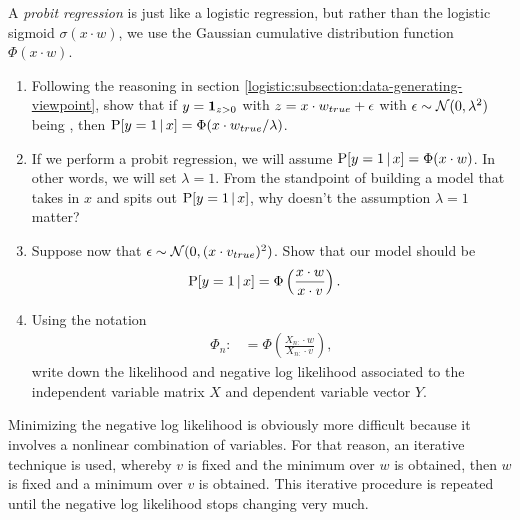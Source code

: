 \begin{exercise}
  A \emph{probit regression} is just like a logistic regression, but rather than the logistic sigmoid $\sigma(x\cdot w)$, we use the Gaussian cumulative distribution function $\Phi(x\cdot w)$. 
  \begin{enumerate}
    \item Following the reasoning in section \ref{logistic:subsection:data-generating-viewpoint}, show that if $y = \mathbf{1}_{z>0}$ with $z = x\cdot w_{true}+{\epsilon}$ with ${\epsilon}\sim{\mathcal N}(0, \lambda^2)$ being \iid, then  $\mathrm{P}[y=1{\,|\,} x] = \Phi(x\cdot w_{true}/\lambda)$.
    \item If we perform a probit regression, we will assume $\mathrm{P}[y=1{\,|\,} x] = \Phi(x\cdot w)$.  In other words, we will set $\lambda=1$.  From the standpoint of building a model that takes in $x$ and spits out $\mathrm{P}[y=1{\,|\,} x]$, why doesn't the assumption $\lambda=1$ matter?
    \item Suppose now that ${\epsilon} \sim{\mathcal N}(0, (x\cdot v_{true})^2)$.  Show that our model should be
      \begin{align*}
        \mathrm{P}[y=1{\,|\,} x] &= \Phi\left( \frac{x\cdot w}{x\cdot v} \right).
      \end{align*}
    \item Using the notation
      \begin{align*}
        \Phi_n :&= \Phi\left( \frac{X_{n:}\cdot w}{X_{n:}\cdot v} \right),
      \end{align*}
      write down the likelihood and negative log likelihood associated to the independent variable matrix $X$ and dependent variable vector $Y$.
  \end{enumerate} 
  Minimizing the negative log likelihood is obviously more difficult because it involves a nonlinear combination of variables.  For that reason, an iterative technique is used, whereby $v$ is fixed and the minimum over $w$ is obtained, then $w$ is fixed and a minimum over $v$ is obtained.  This iterative procedure is repeated until the negative log likelihood stops changing very much.
\end{exercise}

